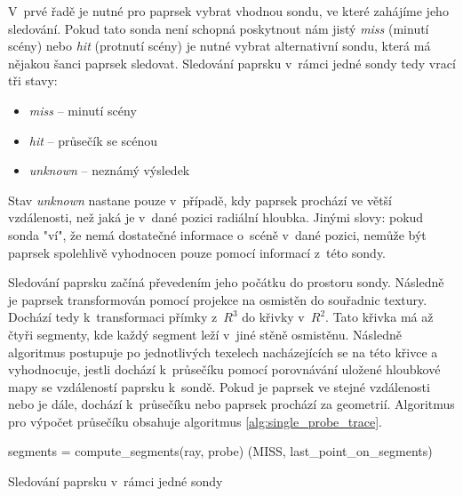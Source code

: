 V~prvé řadě je nutné pro paprsek vybrat vhodnou sondu, ve které zahájíme jeho sledování. Pokud tato sonda není schopná poskytnout nám jistý \textit{miss} (minutí scény) nebo \textit{hit} (protnutí scény) je nutné vybrat alternativní sondu, která má nějakou šanci paprsek sledovat. Sledování paprsku v~rámci jedné sondy tedy vrací tři stavy:
\begin{itemize}
    \item \textit{miss} -- minutí scény
    \item \textit{hit} -- průsečík se scénou
    \item \textit{unknown} -- neznámý výsledek
\end{itemize}

Stav \textit{unknown} nastane pouze v~případě, kdy paprsek prochází ve větší vzdálenosti, než jaká je v~dané pozici radiální hloubka. Jinými slovy: pokud sonda "ví", že nemá dostatečné informace o~scéně v~dané pozici, nemůže být paprsek spolehlivě vyhodnocen pouze pomocí informací z~této sondy.

Sledování paprsku začíná převedením jeho počátku do prostoru sondy. Následně je paprsek transformován pomocí projekce na osmistěn do souřadnic textury. Dochází tedy k~transformaci přímky z~$R^3$ do křivky v~$R^2$. Tato křivka má až čtyři segmenty, kde každý segment leží v~jiné stěně osmistěnu. Následně algoritmus postupuje po jednotlivých texelech nacházejících se na této křivce a vyhodnocuje, jestli dochází k~průsečíku pomocí porovnávání uložené hloubkové mapy se vzdáleností paprsku k~sondě. Pokud je paprsek ve stejné vzdálenosti nebo je dále, dochází k~průsečíku nebo paprsek prochází za geometrií. Algoritmus pro výpočet průsečíku obsahuje algoritmus \ref{alg:single_probe_trace}.

\begin{center}
	\begin{czechalgorithm}[H] \label{alg:single_probe_trace}
	    segments = compute\_segments(ray, probe)\;
	    \KwRet (MISS, last\_point\_on\_segments)\;
		\caption{Sledování paprsku v~rámci jedné sondy}
	\end{czechalgorithm}
\end{center}

